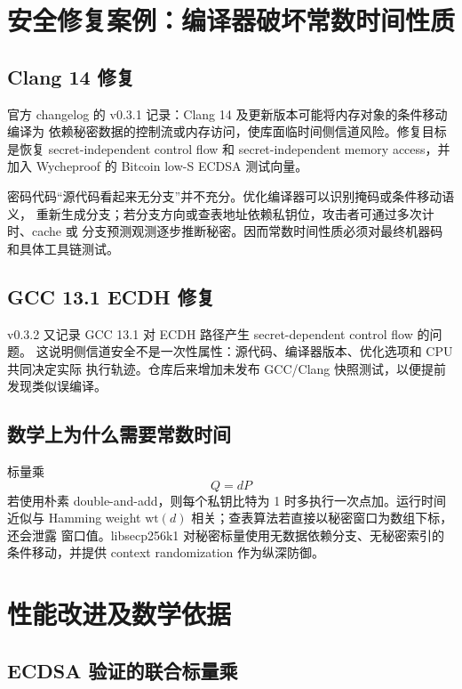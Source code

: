 \documentclass[UTF8,a4paper,12pt]{ctexart}
\begin{document}
\section{安全修复案例：编译器破坏常数时间性质}

\subsection{Clang 14 修复}

官方 changelog 的 v0.3.1 记录：Clang 14 及更新版本可能将内存对象的条件移动编译为
依赖秘密数据的控制流或内存访问，使库面临时间侧信道风险。修复目标是恢复
secret-independent control flow 和 secret-independent memory access，并加入
Wycheproof 的 Bitcoin low-S ECDSA 测试向量。

密码代码“源代码看起来无分支”并不充分。优化编译器可以识别掩码或条件移动语义，
重新生成分支；若分支方向或查表地址依赖私钥位，攻击者可通过多次计时、cache 或
分支预测观测逐步推断秘密。因而常数时间性质必须对最终机器码和具体工具链测试。

\subsection{GCC 13.1 ECDH 修复}

v0.3.2 又记录 GCC 13.1 对 ECDH 路径产生 secret-dependent control flow 的问题。
这说明侧信道安全不是一次性属性：源代码、编译器版本、优化选项和 CPU 共同决定实际
执行轨迹。仓库后来增加未发布 GCC/Clang 快照测试，以便提前发现类似误编译。

\subsection{数学上为什么需要常数时间}

标量乘
\[
Q=dP
\]
若使用朴素 double-and-add，则每个私钥比特为 1 时多执行一次点加。运行时间近似与
Hamming weight $\mathrm{wt}(d)$ 相关；查表算法若直接以秘密窗口为数组下标，还会泄露
窗口值。libsecp256k1 对秘密标量使用无数据依赖分支、无秘密索引的条件移动，并提供
context randomization 作为纵深防御。

\section{性能改进及数学依据}

\subsection{ECDSA 验证的联合标量乘}
\end{document}
